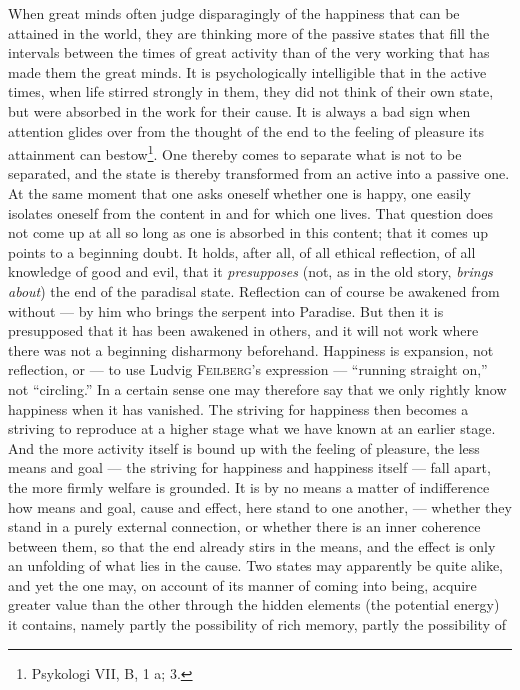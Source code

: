 \documentclass[12pt,a4paper,openany]{book}
\newcommand{\opage}[1]{\marginnote{\footnotesize\textit{[#1]}}}
\begin{document}
When great minds often judge disparagingly of the happiness that can be attained in the world, they are
thinking more of the passive states that fill the intervals between the times of great activity than of
the very working that has made them the great minds. It is psychologically intelligible that in the active
times, when life stirred strongly in them, they did not think of their own state, but were absorbed in the
work for their cause. It is always a bad sign when attention glides over from the thought of the end to
the feeling of pleasure its attainment can bestow\footnote[1]{Psykologi VII, B, 1 a; 3.}. One thereby comes
to separate what is not to be separated, and the state is thereby transformed from an active into a passive
one. At the same moment that one asks oneself whether one is happy, one easily isolates oneself from the
content in and for which one lives. That question does not come up at all so long as one is absorbed in
this content; that it comes up points to a beginning doubt. It holds, after all, of all ethical reflection,
of all knowledge of good and evil, that it \textit{presupposes} (not, as in the old story, \textit{brings
about}) the end of the paradisal state. Reflection can of course be awakened from without --- by him who
brings the serpent into Paradise. But then it is presupposed that it has been awakened in others, and it
will not work where there was not a beginning disharmony beforehand. Happiness is expansion, not
reflection, or --- to use Ludvig \textsc{Feilberg}'s expression --- ``running straight on,'' not
``circling.''
In a certain sense one may therefore say that we only rightly know happiness when it has
\opage{145}vanished. The striving for happiness then becomes a striving to reproduce at a higher stage what we have
known at an earlier stage. And the more activity itself is bound up with the feeling of pleasure, the less
means and goal --- the striving for happiness and happiness itself --- fall apart, the more firmly welfare
is grounded. It is by no means a matter of indifference how means and goal, cause and effect, here stand
to one another, --- whether they stand in a purely external connection, or whether there is an inner
coherence between them, so that the end already stirs in the means, and the effect is only an unfolding of
what lies in the cause. Two states may apparently be quite alike, and yet the one may, on account of its
manner of coming into being, acquire greater value than the other through the hidden elements (the
potential energy) it contains, namely partly the possibility of rich memory, partly the possibility of
\end{document}
